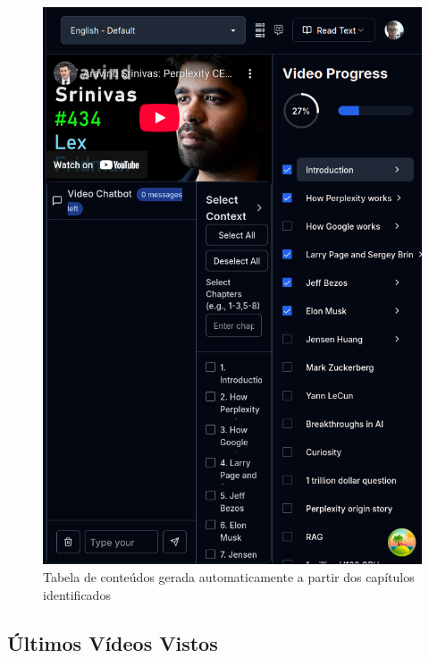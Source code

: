 \documentclass[tcc,capa]{texufpel}
\begin{document}
\begin{figure}[H]
  \centering
  \includegraphics[width=\textwidth,height=0.45\textheight,keepaspectratio]{exemplo-slides/graphics/images/table of contents.png}
  \caption{Tabela de conteúdos gerada automaticamente a partir dos capítulos identificados}
  \label{fig:table_of_contents}
\end{figure}




\subsection{Últimos Vídeos Vistos}
\end{document}
